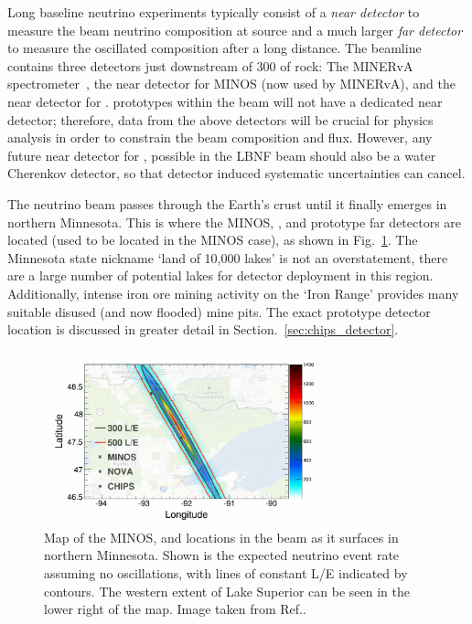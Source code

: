 Long baseline neutrino experiments typically consist of a \emph{near detector} to measure the beam
neutrino composition at source and a much larger \emph{far detector} to measure the oscillated
composition after a long distance. The \numi beamline contains three detectors just downstream of
\unit{300}{} of rock: The MINERvA spectrometer~\cite{mcfarland2006}, the near detector
for MINOS (now used by MINERvA), and the near detector for \nova. \chips prototypes within the
\numi beam will not have a dedicated near detector; therefore, data from the above detectors will
be crucial for physics analysis in order to constrain the beam composition and flux. However, any
future near detector for \chips, possible in the LBNF beam should also be a water Cherenkov
detector, so that detector induced systematic uncertainties can cancel.

The \numi neutrino beam passes through the Earth's crust until it finally emerges in northern
Minnesota. This is where the MINOS, \nova, and prototype \chips far detectors are located (used to
be located in the MINOS case), as shown in Fig.~\ref{fig:numi_map}. The Minnesota state nickname
`land of 10,000 lakes' is not an overstatement, there are a large number of potential lakes for
\chips detector deployment in this region. Additionally, intense iron ore mining activity on the
`Iron Range' provides many suitable disused (and now flooded) mine pits. The exact \chipsfive
prototype detector location is discussed in greater detail in Section.~\ref{sec:chips_detector}.

\begin{figure} %
    \includegraphics[width=0.7\textwidth]{diagrams/4-chips/numi_map.png}
    \caption[Map of detector locations in the \numi beam.]
    {Map of the MINOS, \nova and \chips locations in the \numi beam as it surfaces in northern
        Minnesota. Shown is the expected neutrino event rate assuming no oscillations, with lines
        of constant L/E indicated by contours. The western extent of Lake Superior can be seen in
        the lower right of the map. Image taken from Ref.\cite{adamson2013}.}
    \label{fig:numi_map}
\end{figure}

